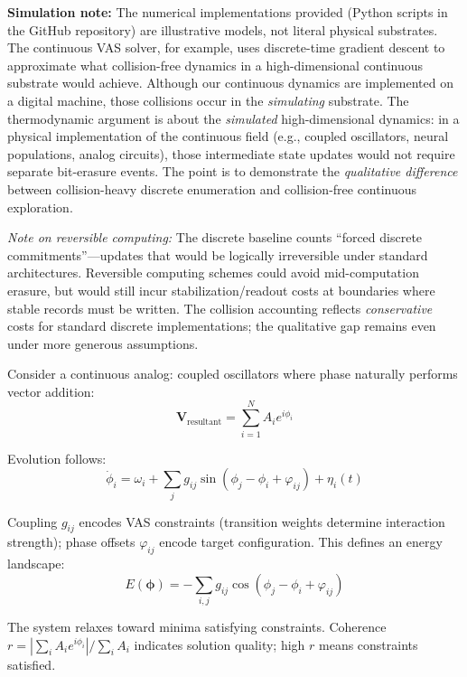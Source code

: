 \documentclass[12pt]{article}
\begin{document}
\textbf{Simulation note:} The numerical implementations provided (Python scripts in the GitHub repository) are illustrative models, not literal physical substrates. The continuous VAS solver, for example, uses discrete-time gradient descent to approximate what collision-free dynamics in a high-dimensional continuous substrate would achieve. Although our continuous dynamics are implemented on a digital machine, those collisions occur in the \textit{simulating} substrate. The thermodynamic argument is about the \textit{simulated} high-dimensional dynamics: in a physical implementation of the continuous field (e.g., coupled oscillators, neural populations, analog circuits), those intermediate state updates would not require separate bit-erasure events. The point is to demonstrate the \textit{qualitative difference} between collision-heavy discrete enumeration and collision-free continuous exploration.

\textit{Note on reversible computing:} The discrete baseline counts ``forced discrete commitments''---updates that would be logically irreversible under standard architectures. Reversible computing schemes could avoid mid-computation erasure, but would still incur stabilization/readout costs at boundaries where stable records must be written. The collision accounting reflects \textit{conservative} costs for standard discrete implementations; the qualitative gap remains even under more generous assumptions.

Consider a continuous analog: coupled oscillators where phase naturally performs vector addition:
\begin{equation}
\mathbf{V}_{\text{resultant}} = \sum_{i=1}^N A_i e^{i\phi_i}
\end{equation}

Evolution follows:
\begin{equation}
\dot{\phi}_i = \omega_i + \sum_j g_{ij} \sin(\phi_j - \phi_i + \varphi_{ij}) + \eta_i(t)
\end{equation}

Coupling $g_{ij}$ encodes VAS constraints (transition weights determine interaction strength); phase offsets $\varphi_{ij}$ encode target configuration. This defines an energy landscape:
\begin{equation}
E(\boldsymbol{\phi}) = -\sum_{i,j} g_{ij} \cos(\phi_j - \phi_i + \varphi_{ij})
\end{equation}

The system relaxes toward minima satisfying constraints. Coherence $r = |\sum_i A_i e^{i\phi_i}|/\sum_i A_i$ indicates solution quality; high $r$ means constraints satisfied.
\end{document}
